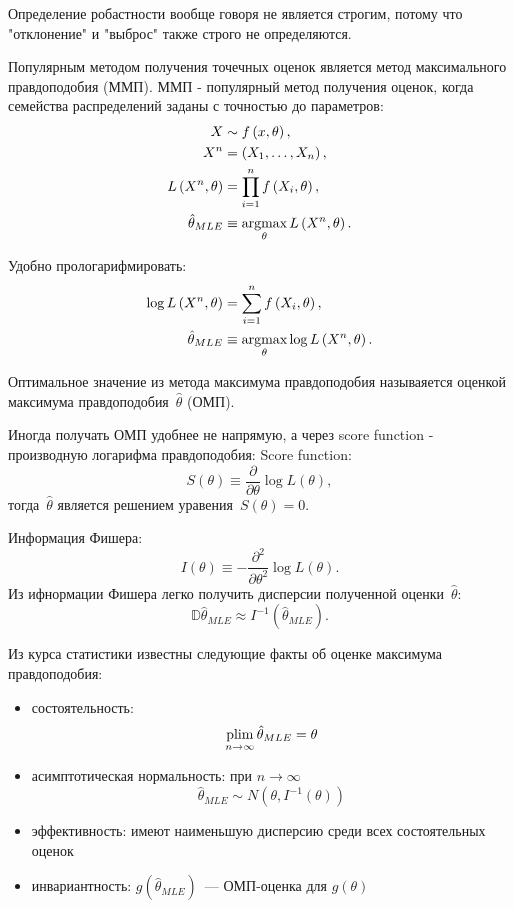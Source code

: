 Определение робастности вообще говоря не является строгим, потому что "отклонение" и "выброс" также строго не определяются.


Популярным методом получения точечных оценок является метод максимального правдоподобия (ММП). ММП - популярный метод получения оценок, когда семейства распределений заданы с точностью до параметров:
\begin{align*}
	X  &\sim f\left(x, \theta\right), \\
	X^n&=\left(X_1,\dots,X_n\right), \\
	L\left(X^n,\theta\right) &= \prod\limits_{i=1}^n f\left(X_i, \theta\right), \\
	\hat{\theta}_{MLE}&\equiv \mathop{\text{argmax}}\limits_{\theta} L\left( X^n, \theta \right).
\end{align*}

Удобно прологарифмировать:
\begin{align*}
	\log L\left(X^n,\theta\right) &= \sum\limits_{i=1}^n f\left(X_i, \theta\right), \\
	\hat{\theta}_{MLE}&\equiv \mathop{\text{argmax}}\limits_{\theta} \log L\left( X^n, \theta \right).
\end{align*}

Оптимальное значение из метода максимума правдоподобия называяется оценкой максимума правдоподобия~$\hat{\theta}$ (ОМП).

Иногда получать ОМП удобнее не напрямую, а через score function - производную логарифма правдоподобия:
Score function:
\[
S\left(\theta\right) \equiv \frac{\partial}{\partial \theta} \log L\left( \theta\right),
\]
тогда~$\hat{\theta}$ является решением уравения~$S\left(\theta\right)=0$.

Информация Фишера:
\[
I\left(\theta\right) \equiv  - \frac{\partial^2}{\partial\theta^2}\log L\left(\theta\right).
\]
Из ифнормации Фишера легко получить дисперсии полученной оценки~$\hat{\theta}$:
\[
\mathbb D\hat{\theta}_{MLE} \approx I^{-1}\left(\hat{\theta}_{MLE}\right).
\]

Из курса статистики известны следующие факты об оценке максимума правдоподобия:
\begin{itemize}
    \item состоятельность: $$\operatorname*{\mathop{plim}}\limits_{n\rightarrow\infty} \hat{\theta}_{MLE}  = \theta$$
    \item асимптотическая нормальность: при $n\rightarrow \infty$ $$\hat{\theta}_{MLE}\sim N\left(\theta, I^{-1}(\theta)\right)$$
    \item эффективность: имеют наименьшую дисперсию среди всех состоятельных оценок
    \item инвариантность: $g\left(\hat{\theta}_{MLE}\right)$~--- ОМП-оценка для $g\left(\theta\right)$
\end{itemize}